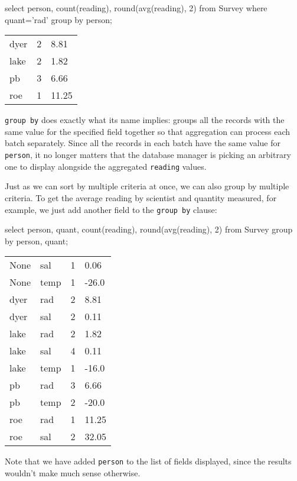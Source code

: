 \documentclass{book}
\begin{document}
\begin{VerbIn}
select   person, count(reading), round(avg(reading), 2)
from     Survey
where    quant='rad'
group by person;
\end{VerbIn}

\begin{tabular}{lll}
dyer & 2 & 8.81 \\
lake & 2 & 1.82 \\
pb & 3 & 6.66 \\
roe & 1 & 11.25 \\
\end{tabular}

\texttt{group by} does exactly what its name implies: groups all the
records with the same value for the specified field together so that
aggregation can process each batch separately. Since all the records in
each batch have the same value for \texttt{person}, it no longer matters
that the database manager is picking an arbitrary one to display
alongside the aggregated \texttt{reading} values.

Just as we can sort by multiple criteria at once, we can also group by
multiple criteria. To get the average reading by scientist and quantity
measured, for example, we just add another field to the
\texttt{group by} clause:

\begin{VerbIn}
select   person, quant, count(reading), round(avg(reading), 2)
from     Survey
group by person, quant;
\end{VerbIn}

\begin{tabular}{llll}
None & sal & 1 & 0.06 \\
None & temp & 1 & -26.0 \\
dyer & rad & 2 & 8.81 \\
dyer & sal & 2 & 0.11 \\
lake & rad & 2 & 1.82 \\
lake & sal & 4 & 0.11 \\
lake & temp & 1 & -16.0 \\
pb & rad & 3 & 6.66 \\
pb & temp & 2 & -20.0 \\
roe & rad & 1 & 11.25 \\
roe & sal & 2 & 32.05 \\
\end{tabular}

Note that we have added \texttt{person} to the list of fields displayed,
since the results wouldn't make much sense otherwise.
\end{document}
